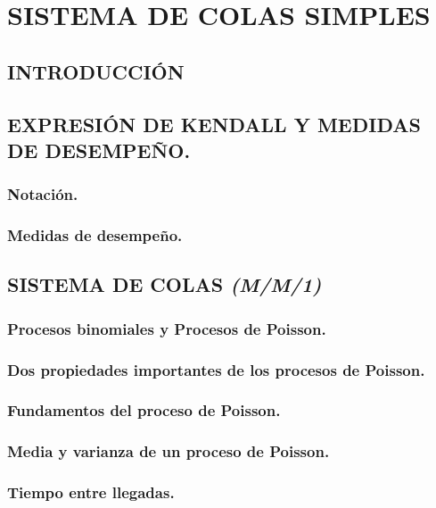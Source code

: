 \chapter{SISTEMA DE COLAS SIMPLES}

\section{INTRODUCCIÓN}\label{intro}


\section{EXPRESIÓN DE KENDALL Y MEDIDAS DE DESEMPEÑO.}
\subsection{Notación.}


\subsection{Medidas de desempeño.}
\section{SISTEMA DE COLAS \textit{(M/M/1)}}

\subsection {Procesos binomiales y Procesos de Poisson.}


\subsection{Dos propiedades importantes de los procesos de Poisson.}


\subsection{Fundamentos del proceso de Poisson.}


\subsection{Media y varianza de un proceso de Poisson.}

\subsection{Tiempo entre llegadas.}


